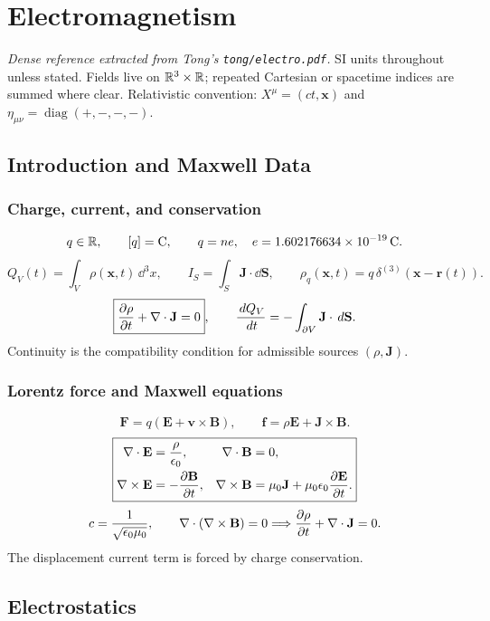 \section{Electromagnetism}
\label{sec:electromagnetism}

\noindent\emph{Dense reference extracted from Tong's \texttt{tong/electro.pdf}.}
SI units throughout unless stated. Fields live on $\mathbb{R}^3\times\mathbb{R}$; repeated Cartesian
or spacetime indices are summed where clear. Relativistic convention:
$X^\mu=(ct,\mathbf x)$ and $\eta_{\mu\nu}=\operatorname{diag}(+,-,-,-)$.

\subsection{Introduction and Maxwell Data}

\subsubsection*{Charge, current, and conservation}
\[
q\in\mathbb{R},\qquad [q]=\mathrm C,\qquad q=ne,\quad e=1.602176634\times10^{-19}\,\mathrm C.
\]
\[
Q_V(t)=\int_V\rho(\mathbf x,t)\,\dd^3x,\qquad
I_S=\int_S\mathbf J\cdot\dd\mathbf S,\qquad
\rho_q(\mathbf x,t)=q\,\delta^{(3)}(\mathbf x-\mathbf r(t)).
\]
\[
\boxed{\frac{\partial\rho}{\partial t}+\nabla\cdot\mathbf J=0},\qquad
\frac{\,d Q_V}{\,d t}=-\int_{\partial V}\mathbf J\cdot\,d\mathbf S.
\]
Continuity is the compatibility condition for admissible sources $(\rho,\mathbf J)$.

\subsubsection*{Lorentz force and Maxwell equations}
\[
\boxed{\mathbf F=q(\mathbf E+\mathbf v\times\mathbf B)},\qquad
\mathbf f=\rho\mathbf E+\mathbf J\times\mathbf B.
\]
\[
\boxed{
\begin{aligned}
\nabla\cdot\mathbf E&=\frac{\rho}{\epsilon_0},&
\nabla\cdot\mathbf B&=0,\\
\nabla\times\mathbf E&=-\frac{\partial\mathbf B}{\partial t},&
\nabla\times\mathbf B&=\mu_0\mathbf J+\mu_0\epsilon_0\frac{\partial\mathbf E}{\partial t}.
\end{aligned}}
\]
\[
c=\frac{1}{\sqrt{\epsilon_0\mu_0}},\qquad
\nabla\cdot(\nabla\times\mathbf B)=0
\Longrightarrow
\frac{\partial\rho}{\partial t}+\nabla\cdot\mathbf J=0.
\]
The displacement current term is forced by charge conservation. 

\subsection{Electrostatics}

